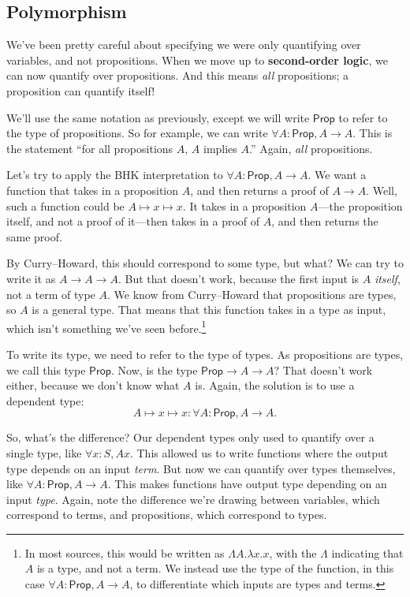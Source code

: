\documentclass[11pt,paper=letter]{scrartcl}
\newcommand{\prop}{\mathsf{Prop}}
\begin{document}
\subsection{Polymorphism}

We've been pretty careful about specifying we were only quantifying over variables, and not propositions. When we move up to \textbf{second-order logic}, we can now quantify over propositions. And this means \emph{all} propositions; a proposition can quantify itself!

We'll use the same notation as previously, except we will write $\prop$ to refer to the type of propositions. So for example, we can write $\forall A: \prop, A \to A$. This is the statement ``for all propositions $A$, $A$ implies $A$.'' Again, \emph{all} propositions.

Let's try to apply the BHK interpretation to $\forall A: \prop, A \to A$. We want a function that takes in a proposition $A$, and then returns a proof of $A \to A$. Well, such a function could be $A \mapsto x \mapsto x$. It takes in a proposition $A$---the proposition itself, and not a proof of it---then takes in a proof of $A$, and then returns the same proof.

By Curry--Howard, this should correspond to some type, but what? We can try to write it as $A \to A \to A$. But that doesn't work, because the first input is $A$ \emph{itself}, not a term of type $A$. We know from Curry--Howard that propositions are types, so $A$ is a general type. That means that this function takes in a type as input, which isn't something we've seen before.\footnote{In most sources, this would be written as $\Lambda A . \lambda x. x$, with the $\Lambda$ indicating that $A$ is a type, and not a term. We instead use the type of the function, in this case $\forall A: \prop, A \to A$, to differentiate which inputs are types and terms.}

To write its type, we need to refer to the type of types. As propositions are types, we call this type $\prop$. Now, is the type $\prop \to A \to A$? That doesn't work either, because we don't know what $A$ is. Again, the solution is to use a dependent type: \[
  A \mapsto x \mapsto x : \forall A: \prop, A \to A.
\]

So, what's the difference? Our dependent types only used to quantify over a single type, like $\forall x: S, Ax$. This allowed us to write functions where the output type depends on an input \emph{term}. But now we can quantify over types themselves, like $\forall A: \prop, A \to A$. This makes functions have output type depending on an input \emph{type}. Again, note the difference we're drawing between variables, which correspond to terms, and propositions, which correspond to types.
\end{document}
